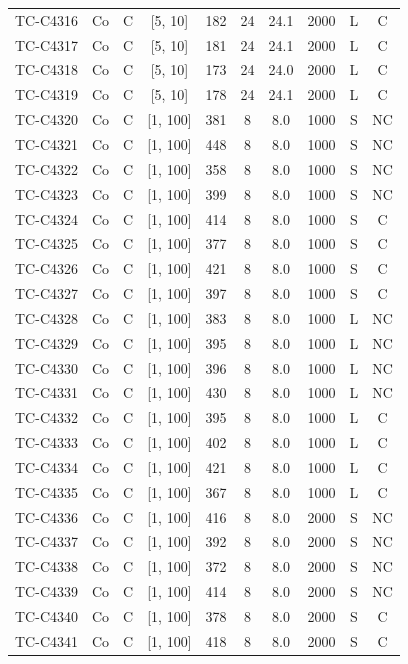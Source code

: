 \begin{longtable}{lccccccccc}
TC-C4316 & Co & C & [5, 10] & 182 & 24 & 24.1 & 2000 & L & C \\
TC-C4317 & Co & C & [5, 10] & 181 & 24 & 24.1 & 2000 & L & C \\
TC-C4318 & Co & C & [5, 10] & 173 & 24 & 24.0 & 2000 & L & C \\
TC-C4319 & Co & C & [5, 10] & 178 & 24 & 24.1 & 2000 & L & C \\
TC-C4320 & Co & C & [1, 100] & 381 & 8 & 8.0 & 1000 & S & NC \\
TC-C4321 & Co & C & [1, 100] & 448 & 8 & 8.0 & 1000 & S & NC \\
TC-C4322 & Co & C & [1, 100] & 358 & 8 & 8.0 & 1000 & S & NC \\
TC-C4323 & Co & C & [1, 100] & 399 & 8 & 8.0 & 1000 & S & NC \\
TC-C4324 & Co & C & [1, 100] & 414 & 8 & 8.0 & 1000 & S & C \\
TC-C4325 & Co & C & [1, 100] & 377 & 8 & 8.0 & 1000 & S & C \\
TC-C4326 & Co & C & [1, 100] & 421 & 8 & 8.0 & 1000 & S & C \\
TC-C4327 & Co & C & [1, 100] & 397 & 8 & 8.0 & 1000 & S & C \\
TC-C4328 & Co & C & [1, 100] & 383 & 8 & 8.0 & 1000 & L & NC \\
TC-C4329 & Co & C & [1, 100] & 395 & 8 & 8.0 & 1000 & L & NC \\
TC-C4330 & Co & C & [1, 100] & 396 & 8 & 8.0 & 1000 & L & NC \\
TC-C4331 & Co & C & [1, 100] & 430 & 8 & 8.0 & 1000 & L & NC \\
TC-C4332 & Co & C & [1, 100] & 395 & 8 & 8.0 & 1000 & L & C \\
TC-C4333 & Co & C & [1, 100] & 402 & 8 & 8.0 & 1000 & L & C \\
TC-C4334 & Co & C & [1, 100] & 421 & 8 & 8.0 & 1000 & L & C \\
TC-C4335 & Co & C & [1, 100] & 367 & 8 & 8.0 & 1000 & L & C \\
TC-C4336 & Co & C & [1, 100] & 416 & 8 & 8.0 & 2000 & S & NC \\
TC-C4337 & Co & C & [1, 100] & 392 & 8 & 8.0 & 2000 & S & NC \\
TC-C4338 & Co & C & [1, 100] & 372 & 8 & 8.0 & 2000 & S & NC \\
TC-C4339 & Co & C & [1, 100] & 414 & 8 & 8.0 & 2000 & S & NC \\
TC-C4340 & Co & C & [1, 100] & 378 & 8 & 8.0 & 2000 & S & C \\
TC-C4341 & Co & C & [1, 100] & 418 & 8 & 8.0 & 2000 & S & C \\

\end{longtable}
